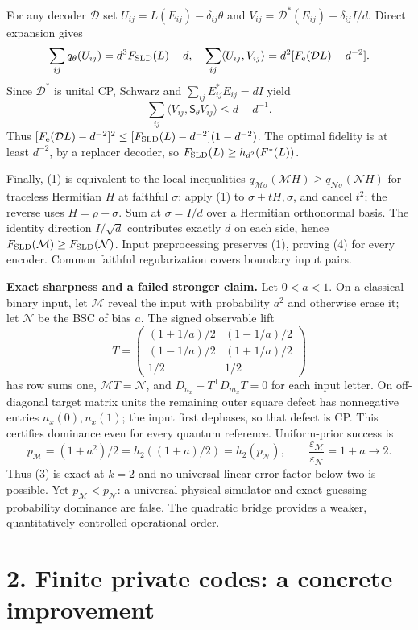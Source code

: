 \documentclass[10pt,a4paper]{article}
\newcommand{\N}{\mathcal N}
\newcommand{\M}{\mathcal M}
\newcommand{\Sld}{\mathsf S}
\newcommand{\Fe}{F_{\mathrm e}}
\begin{document}
For any decoder $\mathcal D$ set $U_{ij}=L(E_{ij})-\delta_{ij}\theta$ and $V_{ij}=\mathcal D^*(E_{ij})-\delta_{ij}I/d$. Direct expansion gives
\[
 \sum_{ij}q_\theta(U_{ij})=d^3F_{\rm SLD}(L)-d,\quad
 \sum_{ij}\langle U_{ij},V_{ij}\rangle=d^2[\Fe(\mathcal DL)-d^{-2}].
\]
Since $\mathcal D^*$ is unital CP, Schwarz and $\sum_{ij}E_{ij}^*E_{ij}=dI$ yield
\[
 \sum_{ij}\langle V_{ij},\Sld_\theta V_{ij}\rangle\le d-d^{-1}.
\]
Thus
$[\Fe(\mathcal DL)-d^{-2}]^2\le[F_{\rm SLD}(L)-d^{-2}](1-d^{-2})$.
The optimal fidelity is at least $d^{-2}$, by a replacer decoder, so $F_{\rm SLD}(L)\ge h_{d^2}(F^*(L))$.

Finally, (1) is equivalent to the local inequalities $q_{\M\sigma}(\M H)\ge q_{\N\sigma}(\N H)$ for traceless Hermitian $H$ at faithful $\sigma$: apply (1) to $\sigma+tH,\sigma$, and cancel $t^2$; the reverse uses $H=\rho-\sigma$. Sum at $\sigma=I/d$ over a Hermitian orthonormal basis. The identity direction $I/\sqrt d$ contributes exactly $d$ on each side, hence $F_{\rm SLD}(\M)\ge F_{\rm SLD}(\N)$. Input preprocessing preserves (1), proving (4) for every encoder. Common faithful regularization covers boundary input pairs.

\textbf{Exact sharpness and a failed stronger claim.} Let $0<a<1$. On a classical binary input, let $\M$ reveal the input with probability $a^2$ and otherwise erase it; let $\N$ be the BSC of bias $a$. The signed observable lift
\[
 T=\begin{pmatrix}(1+1/a)/2&(1-1/a)/2\\
 (1-1/a)/2&(1+1/a)/2\\1/2&1/2\end{pmatrix}
\]
has row sums one, $\M T=\N$, and $D_{n_x}-T^{\mathsf T}D_{m_x}T=0$ for each input letter. On off-diagonal target matrix units the remaining outer square defect has nonnegative entries $n_x(0),n_x(1)$; the input first dephases, so that defect is CP. This certifies dominance even for every quantum reference. Uniform-prior success is
\[
 p_\M=(1+a^2)/2=h_2((1+a)/2)=h_2(p_\N),\qquad
 \frac{\varepsilon_\M}{\varepsilon_\N}=1+a\longrightarrow2. \tag{8}
\]
Thus (3) is exact at $k=2$ and no universal linear error factor below two is possible. Yet $p_\M<p_\N$: a universal physical simulator and exact guessing-probability dominance are false. The quadratic bridge provides a weaker, quantitatively controlled operational order.

\section*{2. Finite private codes: a concrete improvement}
\end{document}
